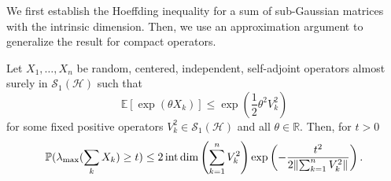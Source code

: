 We first establish the Hoeffding inequality for a sum of sub-Gaussian matrices with the intrinsic dimension. Then, we use an approximation argument to generalize the result for compact operators.

\begin{thm}
    Let \( X_1, \dots, X_n \) be random, centered, independent, self-adjoint operators almost surely in \( \mathcal{S}_1(\mathcal{H}) \) such that 
    \[ \mathbb{E}[\operatorname{exp}(\theta X_k)] \leq \operatorname{exp}(\frac{1}{2} \theta^{2}V_k^{2}) \] for some fixed positive operators \( V_k^{2} \in \mathcal{S}_1(\mathcal{H}) \) and all \( \theta \in \mathbb{R} \). Then, for \( t >0 \)
    \[ \mathbb{P}(\lambda_{\text{max}}(\sum_k X_k) \geq t) \leq 2 \operatorname{int\, dim}\left(\sum_{k=1}^{n}V_k^{2}\right)\operatorname{exp}\left(- \frac{t^{2}}{2 \norm{\sum_{k=1}^{n}V_k^{2}}_{}}\right).\]
\end{thm}

